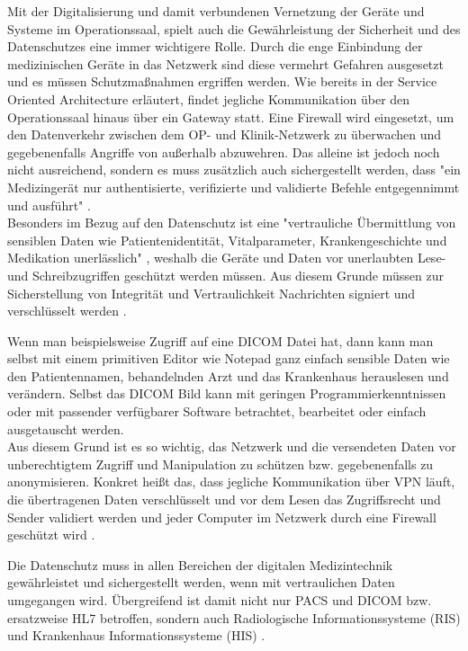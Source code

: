 Mit der Digitalisierung und damit verbundenen Vernetzung der Geräte und Systeme im Operationssaal, spielt auch die Gewährleistung der Sicherheit und des Datenschutzes eine immer wichtigere Rolle.
Durch die enge Einbindung der medizinischen Geräte in das Netzwerk sind diese vermehrt Gefahren ausgesetzt und es müssen Schutzmaßnahmen ergriffen werden. Wie bereits in der Service Oriented Architecture erläutert, findet jegliche Kommunikation über den Operationssaal hinaus über ein Gateway statt. Eine Firewall wird eingesetzt, um den Datenverkehr zwischen dem OP- und Klinik-Netzwerk zu überwachen und gegebenenfalls Angriffe von außerhalb abzuwehren. Das alleine ist jedoch noch nicht ausreichend, sondern es muss zusätzlich auch sichergestellt werden, dass "ein Medizingerät nur authentisierte, verifizierte und validierte Befehle entgegennimmt und ausführt" \cite{DerDigitaleOperationssaal}. \\
Besonders im Bezug auf den Datenschutz ist eine "vertrauliche Übermittlung von sensiblen Daten wie Patientenidentität, Vitalparameter, Krankengeschichte und Medikation unerlässlich" \cite{DerDigitaleOperationssaal}, weshalb die Geräte und Daten vor unerlaubten Lese- und Schreibzugriffen geschützt werden müssen. Aus diesem Grunde müssen zur Sicherstellung von Integrität und Vertraulichkeit Nachrichten signiert und verschlüsselt werden \cite{DerDigitaleOperationssaal}. 

Wenn man beispielsweise Zugriff auf eine DICOM Datei hat, dann kann man selbst mit einem primitiven Editor wie Notepad ganz einfach sensible Daten wie den Patientennamen, behandelnden Arzt und das Krankenhaus herauslesen und verändern. Selbst das DICOM Bild kann mit geringen Programmierkenntnissen oder mit passender verfügbarer Software betrachtet, bearbeitet oder einfach ausgetauscht werden.\\
Aus diesem Grund ist es so wichtig, das Netzwerk und die versendeten Daten vor unberechtigtem Zugriff und Manipulation zu schützen bzw. gegebenenfalls zu anonymisieren. Konkret heißt das, dass jegliche Kommunikation über VPN läuft, die übertragenen Daten verschlüsselt und vor dem Lesen das Zugriffsrecht und Sender validiert werden und jeder Computer im Netzwerk durch eine Firewall geschützt wird \cite{DICOM}. 

Die Datenschutz muss in allen Bereichen der digitalen Medizintechnik gewährleistet und sichergestellt werden, wenn mit vertraulichen Daten umgegangen wird. Übergreifend ist damit nicht nur PACS und DICOM bzw. ersatzweise HL7 betroffen, sondern auch Radiologische Informationssysteme (RIS) und Krankenhaus Informationssysteme (HIS) \cite{DICOM}. 
